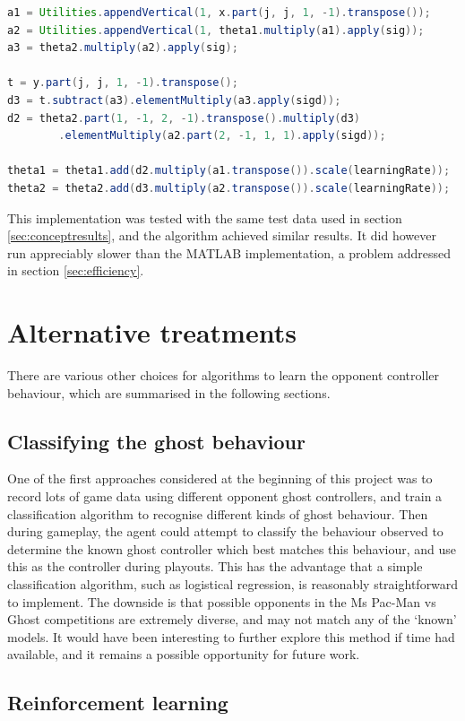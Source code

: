 \begin{lstlisting}[language=Java,label=lst:javanet,caption={Java neural network code},captionpos=b]
a1 = Utilities.appendVertical(1, x.part(j, j, 1, -1).transpose());
a2 = Utilities.appendVertical(1, theta1.multiply(a1).apply(sig));
a3 = theta2.multiply(a2).apply(sig);

t = y.part(j, j, 1, -1).transpose();
d3 = t.subtract(a3).elementMultiply(a3.apply(sigd));
d2 = theta2.part(1, -1, 2, -1).transpose().multiply(d3)
        .elementMultiply(a2.part(2, -1, 1, 1).apply(sigd));

theta1 = theta1.add(d2.multiply(a1.transpose()).scale(learningRate));
theta2 = theta2.add(d3.multiply(a2.transpose()).scale(learningRate));
\end{lstlisting}

This implementation was tested with the same test data used in section \ref{sec:conceptresults}, and the algorithm achieved similar results.  It did however run appreciably slower than the MATLAB implementation, a problem addressed in section \ref{sec:efficiency}.

\section{Alternative treatments}
\label{sec:alternativetreatments}
There are various other choices for algorithms to learn the opponent controller behaviour, which are summarised in the following sections.

\subsection{Classifying the ghost behaviour}

One of the first approaches considered at the beginning of this project was to record lots of game data using different opponent ghost controllers, and train a classification algorithm to recognise different kinds of ghost behaviour.  Then during gameplay, the agent could attempt to classify the behaviour observed to determine the known ghost controller which best matches this behaviour, and use this as the controller during playouts.  This has the advantage that a simple classification algorithm, such as logistical regression, is reasonably straightforward to implement.  The downside is that possible opponents in the Ms Pac-Man vs Ghost competitions are extremely diverse, and may not match any of the `known' models.  It would have been interesting to further explore this method if time had available, and it remains a possible opportunity for future work.

\subsection{Reinforcement learning}



